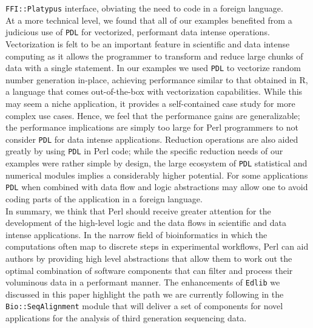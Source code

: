 \documentclass[10pt]{article}
\begin{document}
\texttt{FFI::Platypus} interface, obviating the need to code in a foreign language. 
\\
At a more technical level, we found that all of our examples benefited from a judicious use of \texttt{PDL} for  vectorized, performant data intense operations. Vectorization is felt to be an important feature in scientific and data intense computing as it allows the programmer to transform and reduce large chunks of data with a single statement.  In our examples we used \texttt{PDL} to vectorize random number generation in-place, achieving performance similar to that obtained in R, a language that comes out-of-the-box with vectorization capabilities. While this may seem  a niche application, it provides a self-contained case study for more complex use cases. Hence, we feel that the performance gains are generalizable; the performance implications are simply too large for Perl programmers to not consider \texttt{PDL} for data intense applications. Reduction operations are also aided greatly by using \texttt{PDL} in Perl code; while the specific reduction needs of our examples were rather simple by design, the large ecosystem of \texttt{PDL} statistical and numerical modules implies a considerably higher potential. For some applications \texttt{PDL} when combined with data flow and logic abstractions may allow one to avoid coding parts of the application in a foreign language. 
\\
In summary, we think that Perl should receive greater attention for the development of the high-level logic and the data flows in scientific and data intense applications. In the narrow field of bioinformatics in which the computations often map to discrete steps in experimental workflows, Perl can aid  authors by providing high level abstractions that allow them to work out the optimal combination of software components that can filter and process their voluminous data in a performant manner. The enhancements of \texttt{Edlib} we discussed in this paper highlight the path we are currently following in the \texttt{Bio::SeqAlignment} module that will deliver a set of components for novel applications for the analysis of third generation sequencing data.  
\end{document}
